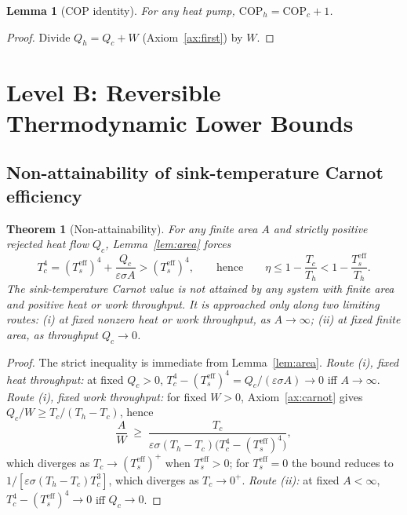 \documentclass[11pt]{article}
\newtheorem{theorem}{Theorem}
\newtheorem{lemma}{Lemma}
\theoremstyle{definition}
\theoremstyle{remark}
\newcommand{\Th}{T_h}
\newcommand{\Tc}{T_c}
\newcommand{\Ts}{T_s^{\mathrm{eff}}}
\newcommand{\eps}{\varepsilon}
\begin{document}
\begin{lemma}[COP identity]\label{lem:cop}
For any heat pump, $\mathrm{COP}_{h}=\mathrm{COP}_{c}+1$.
\end{lemma}
\begin{proof}
Divide $Q_{h}=Q_{c}+W$ (Axiom~\ref{ax:first}) by $W$.
\end{proof}

\section{Level B: Reversible Thermodynamic Lower Bounds}\label{sec:levelB}

\subsection{Non-attainability of sink-temperature Carnot efficiency}

\begin{theorem}[Non-attainability]\label{thm:nonattain}
For any finite area $A$ and strictly positive rejected heat flow $Q_{c}$, Lemma~\ref{lem:area} forces
\begin{equation}
\Tc^{4}=(\Ts)^{4}+\frac{Q_{c}}{\eps\sigma A}>(\Ts)^{4},
\qquad\text{hence}\qquad
\eta\le1-\frac{\Tc}{\Th}<1-\frac{\Ts}{\Th}.
\end{equation}
The sink-temperature Carnot value is not attained by any system with finite area and positive heat or work throughput. It is approached only along two limiting routes: (i) at fixed nonzero heat or work throughput, as $A\to\infty$; (ii) at fixed finite area, as throughput $Q_{c}\to0$.
\end{theorem}

\begin{proof}
The strict inequality is immediate from Lemma~\ref{lem:area}. \emph{Route (i), fixed heat throughput:} at fixed $Q_{c}>0$, $\Tc^{4}-(\Ts)^{4}=Q_{c}/(\eps\sigma A)\to0$ iff $A\to\infty$. \emph{Route (i), fixed work throughput:} for fixed $W>0$, Axiom~\ref{ax:carnot} gives $Q_{c}/W\ge\Tc/(\Th-\Tc)$, hence
\begin{equation}
\frac{A}{W}\;\ge\;\frac{\Tc}{\eps\sigma(\Th-\Tc)\bigl(\Tc^{4}-(\Ts)^{4}\bigr)},
\label{eq:fixedW}
\end{equation}
which diverges as $\Tc\to(\Ts)^{+}$ when $\Ts>0$; for $\Ts=0$ the bound reduces to $1/[\eps\sigma(\Th-\Tc)\Tc^{3}]$, which diverges as $\Tc\to0^{+}$. \emph{Route (ii):} at fixed $A<\infty$, $\Tc^{4}-(\Ts)^{4}\to0$ iff $Q_{c}\to0$.
\end{proof}
\end{document}
